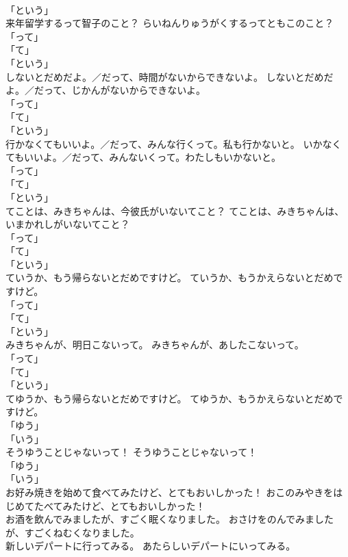 \documentclass[8pt]{extreport}
\begin{document}
\begin{CJK}{UTF8}{min}
\\	「という」	
\\	来年留学するって智子のこと？	らいねんりゅうがくするってともこのこと？	
\\	「って」 
\\	「て」 
\\	「という」	
\\	しないとだめだよ。／だって、時間がないからできないよ。	しないとだめだよ。／だって、じかんがないからできないよ。	
\\	「って」 
\\	「て」 
\\	「という」	
\\	行かなくてもいいよ。／だって、みんな行くって。私も行かないと。	いかなくてもいいよ。／だって、みんないくって。わたしもいかないと。	
\\	「って」 
\\	「て」 
\\	「という」	
\\	てことは、みきちゃんは、今彼氏がいないてこと？	てことは、みきちゃんは、いまかれしがいないてこと？	
\\	「って」 
\\	「て」 
\\	「という」	
\\	ていうか、もう帰らないとだめですけど。	ていうか、もうかえらないとだめですけど。	
\\	「って」 
\\	「て」 
\\	「という」	
\\	みきちゃんが、明日こないって。	みきちゃんが、あしたこないって。	
\\	「って」 
\\	「て」 
\\	「という」	
\\	てゆうか、もう帰らないとだめですけど。	てゆうか、もうかえらないとだめですけど。	
\\	「ゆう」 
\\	「いう」	
\\	そうゆうことじゃないって！	そうゆうことじゃないって！	
\\	「ゆう」 
\\	「いう」	
\\	お好み焼きを始めて食べてみたけど、とてもおいしかった！	おこのみやきをはじめてたべてみたけど、とてもおいしかった！	
\\	お酒を飲んでみましたが、すごく眠くなりました。	おさけをのんでみましたが、すごくねむくなりました。	
\\	新しいデパートに行ってみる。	あたらしいデパートにいってみる。	

\end{CJK}
\end{document}
